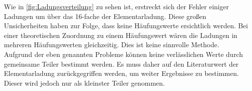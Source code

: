 Wie in \autoref{fig:Ladungsverteilung} zu sehen ist, erstreckt sich der Fehler einiger Ladungen um über das 16-fache der Elementarladung. 
Diese großen Unsicherheiten haben zur Folge, dass keine Häufungswerte ersichtlich werden. Bei einer theoretischen Zuordnung zu einem Häufungswert wären 
die Ladungen in mehreren Häufungswerten gleichzeitig. Dies ist keine sinnvolle Methode.
Aufgrund der eben genannten Probleme können keine verlässlichen Werte durch gemeinsame Teiler bestimmt werden. Es muss daher auf den 
Literaturwert der Elementarladung zurückgegriffen werden, um weiter Ergebnisse zu bestimmen. Dieser wird jedoch nur als kleinster Teiler genommen. 

